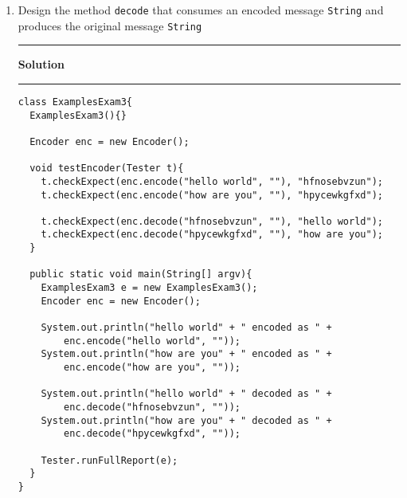 \documentclass[11pt]{article}
\def\thel{\noindent\rule{2.5cm}{.5pt}}
\def\begsol#1{\thel {\bf Solution} \thel}\def\endsol{\relax}
\newcounter{Pctr}
\newenvironment{problem}{\stepcounter{Pctr}%
\begin{description}
\item[\noindent{\bf Problem} \arabic{Pctr}]
\end{description}}{\relax}
\begin{document}
\begin{problem}
\begin{enumerate}
\begin{verbatim}
}
\end{verbatim}
\endsol


\newpage
\item Design the method \texttt{decode} that consumes an encoded message
  \texttt{String} and produces the original message \texttt{String}





\begsol{\vspace{0.5in}}
\begin{verbatim}
class ExamplesExam3{
  ExamplesExam3(){}

  Encoder enc = new Encoder();
  
  void testEncoder(Tester t){
    t.checkExpect(enc.encode("hello world", ""), "hfnosebvzun");
    t.checkExpect(enc.encode("how are you", ""), "hpycewkgfxd");

    t.checkExpect(enc.decode("hfnosebvzun", ""), "hello world");
    t.checkExpect(enc.decode("hpycewkgfxd", ""), "how are you");
  }
  
  public static void main(String[] argv){
    ExamplesExam3 e = new ExamplesExam3();
    Encoder enc = new Encoder();
    
    System.out.println("hello world" + " encoded as " + 
        enc.encode("hello world", ""));
    System.out.println("how are you" + " encoded as " + 
        enc.encode("how are you", ""));

    System.out.println("hello world" + " decoded as " + 
        enc.decode("hfnosebvzun", ""));
    System.out.println("how are you" + " decoded as " + 
        enc.decode("hpycewkgfxd", ""));

    Tester.runFullReport(e);
  }
}
\end{verbatim}
\endsol


\end{enumerate}
\end{problem}
\end{document}
